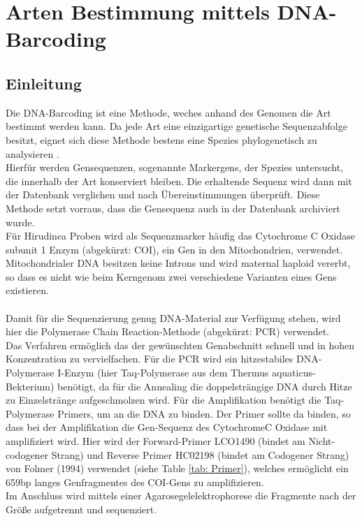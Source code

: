 \documentclass[oneside,10pt,a4paper]{report}
\begin{document}
		\section{Arten Bestimmung mittels DNA-Barcoding}
			\subsection{Einleitung}
				Die DNA-Barcoding ist eine Methode, weches anhand des Genomen die Art bestimmt werden kann.
				Da jede Art eine einzigartige genetische Sequenzabfolge besitzt, eignet sich diese Methode bestens eine Spezies phylogenetisch zu analysieren\cite{Folmer} \cite{Herbert}.\\
				Hierfür werden Gensequenzen, sogenannte Markergens, der Spezies untersucht, die innerhalb der Art konserviert bleiben.
				Die erhaltende Sequenz wird dann mit der Datenbank verglichen und nach Übereinstimmungen überprüft. Diese Methode setzt vorraus, dass die Gensequenz auch in der Datenbank archiviert wurde.\\
				Für Hirudinea Proben wird als Sequenzmarker häufig das  Cytochrome C Oxidase subunit 1 Enzym (abgekürzt: COI), ein Gen in den Mitochondrien, verwendet\cite{Folmer}. Mitochondrialer DNA besitzen keine Introns und wird maternal haploid vererbt, so dass es nicht wie beim Kerngenom zwei verschiedene Varianten eines Gens existieren.\\
				\\
				Damit für die Sequenzierung genug DNA-Material zur Verfügung stehen, wird hier die Polymerase Chain Reaction-Methode (abgekürzt: PCR) verwendet.\\
				Das Verfahren ermöglich das der gewünschten Genabschnitt schnell und in hohen Konzentration zu vervielfachen.
				Für die PCR wird ein hitzestabiles DNA-Polymerase I-Enzym (hier Taq-Polymerase aus dem Thermus aquaticus-Bekterium) benötigt, da für die Annealing die doppelsträngige DNA durch Hitze zu Einzelstränge aufgeschmolzen wird.
				Für die Amplifikation benötigt die Taq-Polymerase Primers, um an die DNA zu binden. Der Primer sollte da binden, so dass bei der Amplifikation die Gen-Sequenz des CytochromeC Oxidase mit amplifiziert wird.
				Hier wird der Forward-Primer LCO1490 (bindet am Nicht-codogener Strang) und Reverse Primer HC02198 (bindet am Codogener Strang) von Folmer (1994) verwendet (siehe Table \ref{tab: Primer}), welches ermöglicht ein 659bp langes Genfragmentes des COI-Gens zu amplifizieren.\\
				Im Anschluss wird mittels einer Agarosegelelektrophorese die Fragmente nach der Größe aufgetrennt und sequenziert.\\
				
\end{document}

